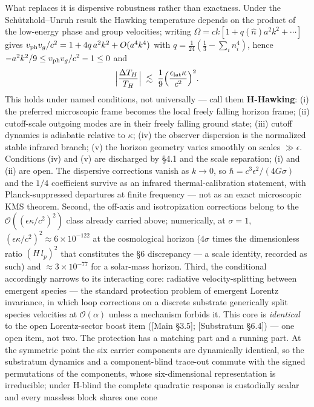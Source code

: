 \documentclass[
]{article}
\begin{document}
What replaces it is dispersive robustness rather than exactness. Under
the Schützhold--Unruh result the Hawking temperature depends on the
product of the low-energy phase and group velocities; writing
\(\Omega=ck[1+q(\hat n)a^2k^2+\cdots]\) gives
\(v_{\rm ph}v_g/c^2=1+4q\,a^2k^2+O(a^4k^4)\) with
\(q=\tfrac1{24}(\tfrac13-\sum_i n_i^4)\), hence
\(-a^2k^2/9\le v_{\rm ph}v_g/c^2-1\le0\) and \[
\Big|\frac{\Delta T_H}{T_H}\Big|\;\lesssim\;\frac19\Big(\frac{\epsilon_{\rm lat}\kappa}{c^2}\Big)^2 .
\] This holds under named conditions, not universally --- call them
\textbf{H-Hawking}: (i) the preferred microscopic frame becomes the
local freely falling horizon frame; (ii) cutoff-scale outgoing modes are
in their freely falling ground state; (iii) cutoff dynamics is adiabatic
relative to \(\kappa\); (iv) the observer dispersion is the normalized
stable infrared branch; (v) the horizon geometry varies smoothly on
scales \(\gg\epsilon\). Conditions (iv) and (v) are discharged by §4.1
and the scale separation; (i) and (ii) are open. The dispersive
corrections vanish as \(k\to0\), so \(\hbar=c^3\epsilon^2/(4G\sigma)\)
and the \(1/4\) coefficient survive as an infrared thermal-calibration
statement, with Planck-suppressed departures at finite frequency --- not
as an exact microscopic KMS theorem. Second, the off-axis and
isotropization corrections belong to the
\(\mathcal{O}((\epsilon\kappa/c^2)^2)\) class already carried above;
numerically, at \(\sigma = 1\),
\((\epsilon\kappa/c^2)^2 \approx 6 \times 10^{-122}\) at the
cosmological horizon (\(4\sigma\) times the dimensionless ratio
\((H\,l_p)^2\) that constitutes the §6 discrepancy --- a scale identity,
recorded as such) and \(\approx 3 \times 10^{-77}\) for a solar-mass
horizon. Third, the conditional accordingly narrows to its interacting
core: radiative velocity-splitting between emergent species --- the
standard protection problem of emergent Lorentz invariance, in which
loop corrections on a discrete substrate generically split species
velocities at \(\mathcal{O}(\alpha)\) unless a mechanism forbids it.
This core is \emph{identical} to the open Lorentz-sector boost item
({[}Main §3.5{]}; {[}Substratum §6.4{]}) --- one open item, not two. The
protection has a matching part and a running part. At the symmetric
point the six carrier components are dynamically identical, so the
substratum dynamics and a component-blind trace-out commute with the
signed permutations of the components, whose six-dimensional
representation is irreducible; under H-blind the complete quadratic
response is custodially scalar and every massless block shares one cone
\end{document}
